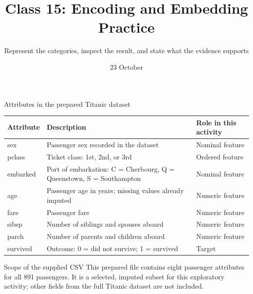 

\title{Class 15: Encoding and Embedding Practice}
\subtitle{Represent the categories, inspect the result, and state what the evidence supports}
\author{\coursename}
\date{23 October}



\frame{\titlepage \coursefooter}

\begin{frame}{Attributes in the prepared Titanic dataset}
\footnotesize
\begin{tabularx}{\textwidth}{>{\ttfamily}l X l}
\toprule
Attribute & Description & Role in this activity \\
\midrule
sex & Passenger sex recorded in the dataset & Nominal feature \\
pclass & Ticket class: 1st, 2nd, or 3rd & Ordered feature \\
embarked & Port of embarkation: C = Cherbourg, Q = Queenstown, S = Southampton & Nominal feature \\
age & Passenger age in years; missing values already imputed & Numeric feature \\
fare & Passenger fare & Numeric feature \\
sibsp & Number of siblings and spouses aboard & Numeric feature \\
parch & Number of parents and children aboard & Numeric feature \\
survived & Outcome: 0 = did not survive; 1 = survived & Target \\
\bottomrule
\end{tabularx}

\vspace{0.5em}
\begin{alertblock}{Scope of the supplied CSV}
This prepared file contains eight passenger attributes for all 891 passengers. It is a selected, imputed subset for this exploratory activity; other fields from the full Titanic dataset are not included.
\end{alertblock}
\coursefooter
\end{frame}

